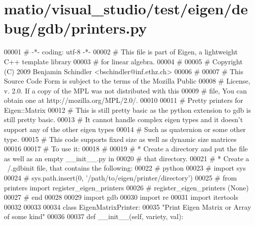 \hypertarget{matio_2visual__studio_2test_2eigen_2debug_2gdb_2printers_8py_source}{}\section{matio/visual\+\_\+studio/test/eigen/debug/gdb/printers.py}
\label{matio_2visual__studio_2test_2eigen_2debug_2gdb_2printers_8py_source}

\begin{DoxyCode}
00001 \textcolor{comment}{# -*- coding: utf-8 -*-}
00002 \textcolor{comment}{# This file is part of Eigen, a lightweight C++ template library}
00003 \textcolor{comment}{# for linear algebra.}
00004 \textcolor{comment}{#}
00005 \textcolor{comment}{# Copyright (C) 2009 Benjamin Schindler <bschindler@inf.ethz.ch>}
00006 \textcolor{comment}{#}
00007 \textcolor{comment}{# This Source Code Form is subject to the terms of the Mozilla Public}
00008 \textcolor{comment}{# License, v. 2.0. If a copy of the MPL was not distributed with this}
00009 \textcolor{comment}{# file, You can obtain one at http://mozilla.org/MPL/2.0/.}
00010 
00011 \textcolor{comment}{# Pretty printers for Eigen::Matrix}
00012 \textcolor{comment}{# This is still pretty basic as the python extension to gdb is still pretty basic. }
00013 \textcolor{comment}{# It cannot handle complex eigen types and it doesn't support any of the other eigen types}
00014 \textcolor{comment}{# Such as quaternion or some other type. }
00015 \textcolor{comment}{# This code supports fixed size as well as dynamic size matrices}
00016 
00017 \textcolor{comment}{# To use it:}
00018 \textcolor{comment}{#}
00019 \textcolor{comment}{# * Create a directory and put the file as well as an empty \_\_init\_\_.py in }
00020 \textcolor{comment}{#   that directory.}
00021 \textcolor{comment}{# * Create a ~/.gdbinit file, that contains the following:}
00022 \textcolor{comment}{#      python}
00023 \textcolor{comment}{#      import sys}
00024 \textcolor{comment}{#      sys.path.insert(0, '/path/to/eigen/printer/directory')}
00025 \textcolor{comment}{#      from printers import register\_eigen\_printers}
00026 \textcolor{comment}{#      register\_eigen\_printers (None)}
00027 \textcolor{comment}{#      end}
00028 
00029 \textcolor{keyword}{import} gdb
00030 \textcolor{keyword}{import} re
00031 \textcolor{keyword}{import} itertools
00032 
00033 
00034 \textcolor{keyword}{class }EigenMatrixPrinter:
00035     \textcolor{stringliteral}{"Print Eigen Matrix or Array of some kind"}
00036 
00037     \textcolor{keyword}{def }\_\_init\_\_(self, variety, val):

\end{DoxyCode}
